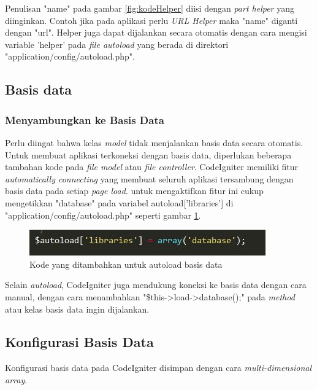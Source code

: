 	Penulisan "name" pada gambar \ref{fig:kodeHelper} diisi dengan \textit{part helper} yang diinginkan. Contoh jika pada aplikasi perlu \textit{URL Helper} maka "name" diganti dengan "url". Helper juga dapat dijalankan secara otomatis dengan cara mengisi variable 'helper' pada \textit{file autoload} yang berada di direktori "application/config/autoload.php".
	
	\subsection{Basis data}
	\label{sub: database}
	
	\subsubsection{Menyambungkan ke Basis Data}
	\label{subsub: connectDatabase}
	
	Perlu diingat bahwa kelas \textit{model} tidak menjalankan basis data secara otomatis. Untuk membuat aplikasi terkoneksi dengan basis data, diperlukan beberapa tambahan kode pada \textit{file model} atau \textit{file controller}.
	CodeIgniter memiliki fitur \textit{automatically connecting} yang membuat seluruh aplikasi tersambung dengan basis data pada setiap \textit{page load}. untuk mengaktifkan fitur ini cukup mengetikkan "database" pada variabel autoload['libraries'] di "application/config/autoload.php" seperti gambar \ref{fig:autoload}.
	
	\begin{figure}[H]
		\centering
		\includegraphics[scale=1]{Gambar/autoload}
		\caption{Kode yang ditambahkan untuk autoload basis data}
		\label{fig:autoload}
	\end{figure}
	
	Selain \textit{autoload}, CodeIgniter juga mendukung koneksi ke basis data dengan cara manual, dengan cara menambahkan "\$this->load->database();" pada \textit{method} atau kelas basis data ingin dijalankan.
	
	\subsection{Konfigurasi Basis Data}
	\label{sub: databaseConf}
	
	Konfigurasi basis data pada CodeIgniter disimpan dengan cara \textit{multi-dimensional array}.
	
